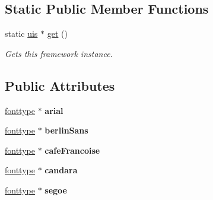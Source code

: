 \subsection*{Static Public Member Functions}
\begin{DoxyCompactItemize}
\item 
static \hyperlink{classflounder_1_1uis}{uis} $\ast$ \hyperlink{classflounder_1_1uis_aac58b792bb86c0b2d1c5a67de0ec0c22}{get} ()
\begin{DoxyCompactList}\small\item\em Gets this framework instance. \end{DoxyCompactList}\end{DoxyCompactItemize}
\subsection*{Public Attributes}
\begin{DoxyCompactItemize}
\item 
\mbox{\label{classflounder_1_1uis_af6d98ed167a49774182e2cf1fde5665a}} 
\hyperlink{classflounder_1_1fonttype}{fonttype} $\ast$ {\bfseries arial}
\item 
\mbox{\label{classflounder_1_1uis_a48c68206f2fcc578acfbb4c9dba4f116}} 
\hyperlink{classflounder_1_1fonttype}{fonttype} $\ast$ {\bfseries berlin\+Sans}
\item 
\mbox{\label{classflounder_1_1uis_a61ceea9783325931983736e0e914597a}} 
\hyperlink{classflounder_1_1fonttype}{fonttype} $\ast$ {\bfseries cafe\+Francoise}
\item 
\mbox{\label{classflounder_1_1uis_a604aaadee498334f6e44356a4fd929d3}} 
\hyperlink{classflounder_1_1fonttype}{fonttype} $\ast$ {\bfseries candara}
\item 
\mbox{\label{classflounder_1_1uis_a6d029bab8fdf86cc82f5c5473144df37}} 
\hyperlink{classflounder_1_1fonttype}{fonttype} $\ast$ {\bfseries segoe}
\end{DoxyCompactItemize}
